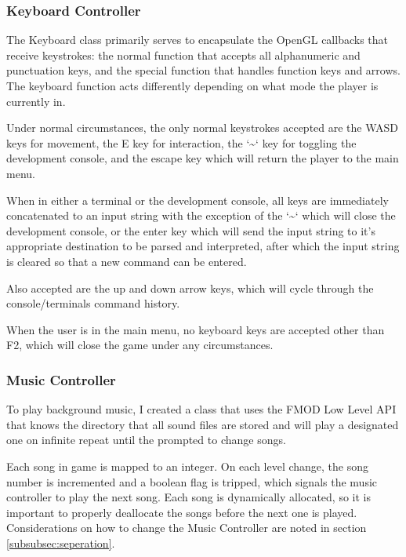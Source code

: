 \documentclass{article}
\begin{document}
\subsubsection{Keyboard Controller} \label{subsubsec:keyboard}

The Keyboard class primarily serves to encapsulate the OpenGL callbacks that receive keystrokes: the normal function that accepts all alphanumeric and punctuation keys, and the special function that handles function keys and arrows. The keyboard function acts differently depending on what mode the player is currently in.

Under normal circumstances, the only normal keystrokes accepted are the WASD keys for movement, the E key for interaction, the `\textasciitilde` key for toggling the development console, and the escape key which will return the player to the main menu.

When in either a terminal or the development console, all keys are immediately concatenated to an input string with the exception of the `\textasciitilde` which will close the development console, or the enter key which will send the input string to it's appropriate destination to be parsed and interpreted, after which the input string is cleared so that a new command can be entered.

Also accepted are the up and down arrow keys, which will cycle through the console/terminals command history.

When the user is in the main menu, no keyboard keys are accepted other than F2, which will close the game under any circumstances.

\subsubsection{Music Controller} \label{subsubsec:musiccontroller}

To play background music, I created a class that uses the FMOD Low Level API that knows the directory that all sound files are stored and will play a designated one on infinite repeat until the prompted to change songs.

Each song in game is mapped to an integer. On each level change, the song number is incremented and a boolean flag is tripped, which signals the music controller to play the next song. Each song is dynamically allocated, so it is important to properly deallocate the songs before the next one is played. Considerations on how to change the Music Controller are noted in section \ref{subsubsec:seperation}.
\end{document}
